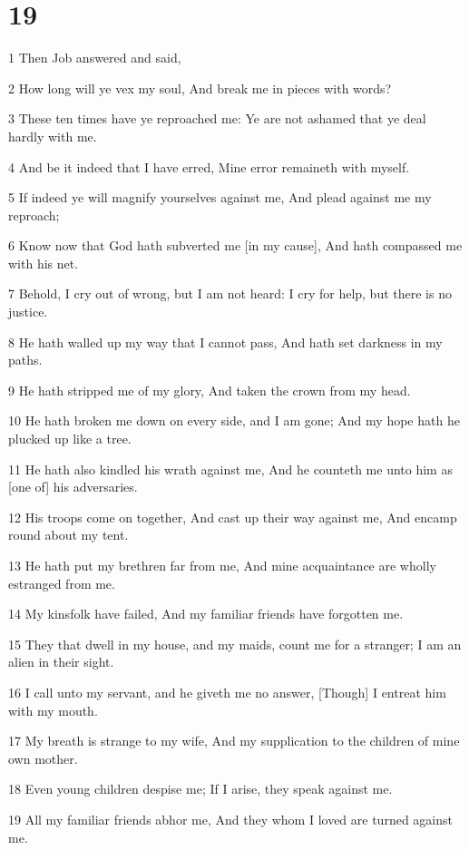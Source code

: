 \chapter{19}

\par 1 Then Job answered and said,
\par 2 How long will ye vex my soul, And break me in pieces with words?
\par 3 These ten times have ye reproached me: Ye are not ashamed that ye deal hardly with me.
\par 4 And be it indeed that I have erred, Mine error remaineth with myself.
\par 5 If indeed ye will magnify yourselves against me, And plead against me my reproach;
\par 6 Know now that God hath subverted me [in my cause], And hath compassed me with his net.
\par 7 Behold, I cry out of wrong, but I am not heard: I cry for help, but there is no justice.
\par 8 He hath walled up my way that I cannot pass, And hath set darkness in my paths.
\par 9 He hath stripped me of my glory, And taken the crown from my head.
\par 10 He hath broken me down on every side, and I am gone; And my hope hath he plucked up like a tree.
\par 11 He hath also kindled his wrath against me, And he counteth me unto him as [one of] his adversaries.
\par 12 His troops come on together, And cast up their way against me, And encamp round about my tent.
\par 13 He hath put my brethren far from me, And mine acquaintance are wholly estranged from me.
\par 14 My kinsfolk have failed, And my familiar friends have forgotten me.
\par 15 They that dwell in my house, and my maids, count me for a stranger; I am an alien in their sight.
\par 16 I call unto my servant, and he giveth me no answer, [Though] I entreat him with my mouth.
\par 17 My breath is strange to my wife, And my supplication to the children of mine own mother.
\par 18 Even young children despise me; If I arise, they speak against me.
\par 19 All my familiar friends abhor me, And they whom I loved are turned against me.
